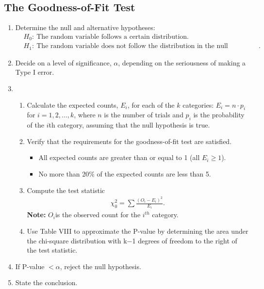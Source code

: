 \documentclass{report}
\begin{document}
    \subsection*{The Goodness-of-Fit Test}
    \bigbreak \noindent 
        \begin{enumerate}
        \item Determine the null and alternative hypotheses:
            \begin{align*}
                &H_{0}:\ \text{The random variable follows a certain distribution.} \\
                &H_{1}:\ \text{The random variable does not follow the distribution in the null hypothesis.}
            .\end{align*}
        \item  Decide on a level of significance, $\alpha$, depending on the seriousness of making a Type I error.
        \item \begin{enumerate}[label=\alph*.)]
            \item Calculate the expected counts, \(E_i\), for each of the \(k\) categories: \(E_i = n \cdot p_i\) for \(i = 1, 2, \ldots, k\), where \(n\) is the number of trials and \(p_i\) is the probability of the \(i\)th category, assuming that the null hypothesis is true.
            \item  Verify that the requirements for the goodness-of-fit test are satisfied.
                \begin{itemize}
                    \item All expected counts are greater than or equal to 1 (all $E_{i} \geq 1$).
                    \item No more than 20\% of the expected counts are less than 5.
                \end{itemize}
            \item  Compute the test statistic
                \begin{align*}
                    \chi^{2}_{0} = \sum \frac{(O_{i}-E_{i})^{2}}{E_{i}}
                .\end{align*}
            \textbf{Note:} $O_{i} $is the observed count for the $i^{th}$ category.
            \item Use Table VIII to approximate the P-value by determining the area under the chi-square distribution with k−1 degrees of freedom to the right of the test statistic.
        \end{enumerate}
        \item If P-value $<\alpha$, reject the null hypothesis.
        \item  State the conclusion.
    \end{enumerate}
\end{document}
